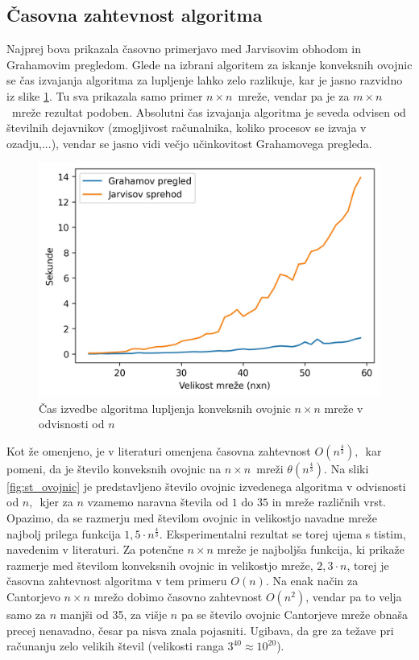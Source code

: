\documentclass[a4paper]{article}
\begin{document}
\subsection{Časovna zahtevnost algoritma}
Najprej bova prikazala časovno primerjavo med Jarvisovim obhodom in Grahamovim pregledom. Glede na izbrani algoritem za iskanje konveksnih ovojnic se čas izvajanja algoritma za lupljenje
lahko zelo razlikuje, kar je jasno razvidno iz slike \ref{fig:cas}. Tu sva prikazala samo primer $n \times n$~mreže, vendar pa je za $m \times n$~mreže rezultat podoben. Absolutni
čas izvajanja algoritma je seveda odvisen od številnih dejavnikov (zmogljivost računalnika, koliko procesov se izvaja v ozadju,...), vendar se jasno vidi
večjo učinkovitost Grahamovega pregleda.

\begin{figure}[!h]
	\centering
	\caption{Čas izvedbe algoritma lupljenja konveksnih ovojnic $n \times n$ mreže v odvisnosti od $n$}
	\label{fig:cas}
	\vspace{2mm}
	\includegraphics[scale=0.6]{slike/cas.jpg}
\end{figure}

Kot že omenjeno, je v literaturi omenjena časovna zahtevnost $O(n ^ \frac{4}{3}),$~kar pomeni, da je število konveksnih ovojnic na $n \times n$~mreži $\theta(n ^ \frac{4}{3})$.
Na sliki \ref{fig:st_ovojnic} je predstavljeno število ovojnic izvedenega algoritma v odvisnosti od $n,$~kjer za $n$ vzamemo naravna števila od $1$ do $35$ in mreže različnih vrst. 
Opazimo, da se razmerju med številom ovojnic in velikostjo navadne mreže najbolj prilega funkcija $1,5 \cdot n ^ \frac{4}{3}.$ Eksperimentalni rezultat se torej ujema s tistim, navedenim v 
literaturi. Za potenčne $n \times n$ mreže je najboljša funkcija, ki prikaže razmerje med številom konveksnih ovojnic in velikostjo mreže, $2,3 \cdot n$, torej je časovna zahtevnost algoritma
v tem primeru $O(n)$. Na enak način za Cantorjevo $n \times n$ mrežo dobimo časovno zahtevnost $O(n^2)$, vendar pa to velja samo za $n$ manjši od 35, za višje $n$ pa se
število ovojnic Cantorjeve mreže obnaša precej nenavadno, česar pa nisva znala pojasniti. Ugibava, da gre za težave pri računanju zelo velikih števil (velikosti ranga $3^{40} \approx 10^{20}$).
\end{document}
